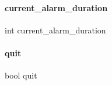 \paragraph{current\+\_\+alarm\+\_\+duration}
{\footnotesize\ttfamily int current\+\_\+alarm\+\_\+duration}

\mbox{\label{a00008_ac746fa6ad48d19984a159f14bec028a3}} 
\paragraph{quit}
{\footnotesize\ttfamily bool quit}

